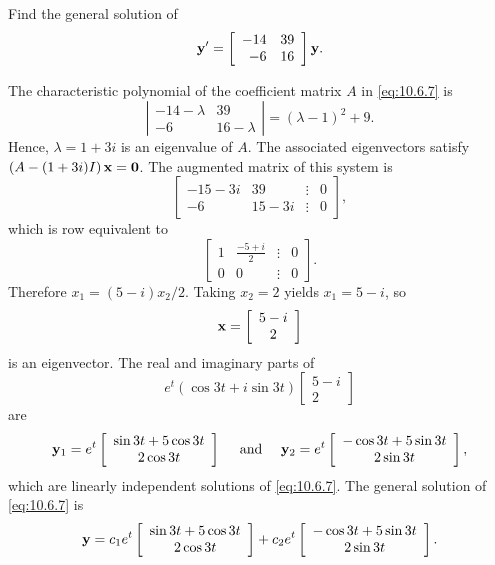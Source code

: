 \begin{example}
  \label{example:10.6.2} \rm Find the general solution of
  \begin{equation}
    \label{eq:10.6.7}{\bf y}'=\left[\begin{array}{rr} -14&39\\-6&16\end{array}\right]{\bf y}.
  \end{equation}
\end{example}

\begin{examplesolution}
\solution The characteristic polynomial of the coefficient matrix $A$ in \eqref{eq:10.6.7} is
\[
  \left|
  \begin{array}{cc}
    -14-\lambda & 39         \\
    -6          & 16-\lambda
  \end{array}\right|=(\lambda-1)^{2}+9.
\]
Hence, $\lambda=1+3i$ is an eigenvalue of $A$. The associated eigenvectors satisfy
$\left(A-(1+3i)I\right){\bf x}={\bf0}$. The augmented matrix of this system is
\[
  \left[
  \begin{array}{cccr}
    -15-3i & 39    & \vdots & 0 \\
    -6     & 15-3i & \vdots & 0
  \end{array}\right],
\]
which is row equivalent to
\[
  \left[
  \begin{array}{cccr}
    1 & \frac{-5+i}{2} & \vdots & 0 \\
    0 & 0              & \vdots & 0
  \end{array}\right].
\]
Therefore $x_{1}=(5-i)x_{2}/2$. Taking $x_{2}=2$ yields $x_{1}=5-i$, so
\[
  {\bf x}=\left[
  \begin{array}{c}
    5-i \\
    2
  \end{array}\right]
\]
is an eigenvector. The real and imaginary parts of
\[
  e^{t}(\cos3t+i\sin3t)\left[
  \begin{array}{c}
    5-i \\
    2
  \end{array}\right]
\]
are
\[
  {\bf y}_{1}=e^{t}\left[
  \begin{array}{c}
    \sin3t+5\cos3t \\
    2\cos 3t
  \end{array}\right]\quad\mbox{ and }\quad{\bf y}_{2}=e^{t}\left[
  \begin{array}{c}
    -\cos3t+5\sin3t \\
    2\sin 3t
  \end{array}\right],
\]
which are linearly independent solutions of \eqref{eq:10.6.7}. The general solution of
\eqref{eq:10.6.7} is
\[
  {\bf y}=c_{1}e^{t}\left[
  \begin{array}{c}
    \sin3t+5\cos3t \\
    2\cos 3t
  \end{array}\right]+ c_{2}e^{t}\left[
  \begin{array}{c}
    -\cos3t+5\sin3t \\
    2\sin 3t
  \end{array}\right].
\]
\end{examplesolution}

